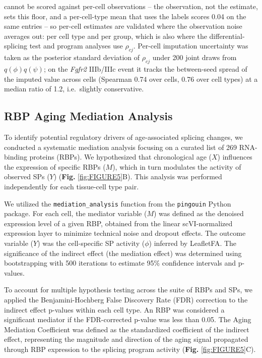 cannot be scored against per-cell observations -- the observation, not the estimate, sets this floor, and a per-cell-type mean that uses the labels scores 0.04 on the same entries -- so per-cell estimates are validated where the observation noise averages out: per cell type and per group, which is also where the differential-splicing test and program analyses use $\rho_{cj}$. Per-cell imputation uncertainty was taken as the posterior standard deviation of $\rho_{cj}$ under 200 joint draws from $q(\phi)q(\psi)$; on the \textit{Fgfr2} IIIb/IIIc event it tracks the between-seed spread of the imputed value across cells (Spearman 0.74 over cells, 0.76 over cell types) at a median ratio of 1.2, i.e.\ slightly conservative.

\iffalse
\subsection*{RBP Aging Mediation Analysis}

To identify potential regulatory drivers of age-associated splicing changes, we conducted a systematic mediation analysis focusing on a curated list of 269 RNA-binding proteins (RBPs). We hypothesized that chronological age ($X$) influences the expression of specific RBPs ($M$), which in turn modulates the activity of observed SPs ($Y$) (\textbf{Fig.} \ref{fig:FIGURE5}B). This analysis was performed independently for each tissue-cell type pair.

We utilized the \texttt{mediation\_analysis} function from the \texttt{pingouin} Python package. For each cell, the mediator variable ($M$) was defined as the denoised expression level of a given RBP, obtained from the linear scVI-normalized expression layer to minimize technical noise and dropout effects. The outcome variable ($Y$) was the cell-specific SP activity ($\phi$) inferred by LeafletFA. The significance of the indirect effect (the mediation effect) was determined using bootstrapping with 500 iterations to estimate 95\% confidence intervals and p-values.

To account for multiple hypothesis testing across the suite of RBPs and SPs, we applied the Benjamini-Hochberg False Discovery Rate (FDR) correction to the indirect effect p-values within each cell type. An RBP was considered a significant mediator if the FDR-corrected p-value was less than 0.05. The Aging Mediation Coefficient was defined as the standardized coefficient of the indirect effect, representing the magnitude and direction of the aging signal propagated through RBP expression to the splicing program activity (\textbf{Fig.} \ref{fig:FIGURE5}C).

